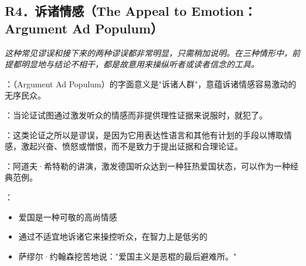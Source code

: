 \subsection{R4．诉诸情感（The Appeal to Emotion：Argument Ad Populum）}

\begin{logicbox}[title=引言]
\textit{这种常见谬误和接下来的两种谬误都非常明显，只需稍加说明。在三种情形中，前提都明显地与结论不相干，都是故意用来操纵听者或读者信念的工具。}
\end{logicbox}

\begin{theorembox}[title=诉诸情感谬误的定义与特征]
：（Argument Ad Populum）的字面意义是"诉诸人群"，意蕴诉诸情感容易激动的无序民众。

：当论证试图通过激发听众的情感而非提供理性证据来说服时，就犯了。

：这类论证之所以是谬误，是因为它用表达性语言和其他有计划的手段以博取情感，激起兴奋、愤怒或憎恨，而不是致力于提出证据和合理论证。

：阿道夫·希特勒的讲演，激发德国听众达到一种狂热爱国状态，可以作为一种经典范例。

：
\begin{itemize}
  \item 爱国是一种可敬的高尚情感
  \item 通过不适宜地诉诸它来操控听众，在智力上是低劣的
  \item 萨缪尔·约翰森挖苦地说："爱国主义是恶棍的最后避难所。"
\end{itemize}
\end{theorembox}

